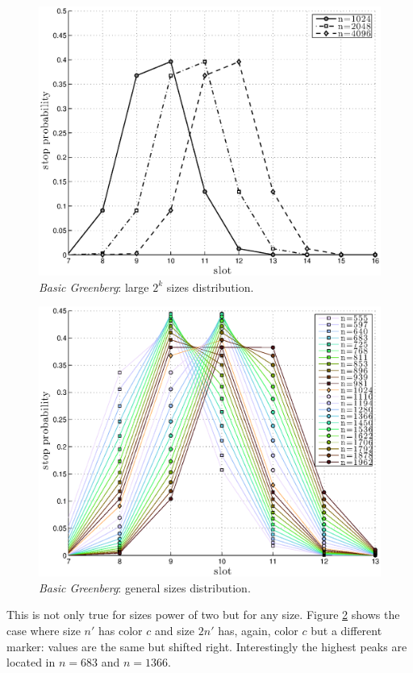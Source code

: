 \documentclass[12pt,a4paper]{report}
\begin{document}
\begin{figure}[H]
\begin{center}
\includegraphics[scale=0.7]{matlab/Greenberg_stop_prob/greenberg-stop-distribution-uniformity}
\caption{\emph{Basic Greenberg}:  large $2^{k}$ sizes distribution.}
\label{fig:greenberg-dist-large}
\end{center}
\end{figure}


\begin{figure}[H]
\begin{center}
\includegraphics[scale=.7]{matlab/Greenberg_stop_prob/greenberg-stop-distribution-intermediate-values}
\caption{\emph{Basic Greenberg}:  general sizes distribution.}
\label{fig:greenberg-dist-general}
\end{center}
\end{figure}
This is not only true for sizes power of two but for any size. Figure \ref{fig:greenberg-dist-general} shows the case where size $n'$ has color $c$ and size $2n'$ has, again, color $c$ but a different marker: values are the same but shifted right. Interestingly the highest peaks are located in $n=683$ and $n=1366$.
\end{document}

